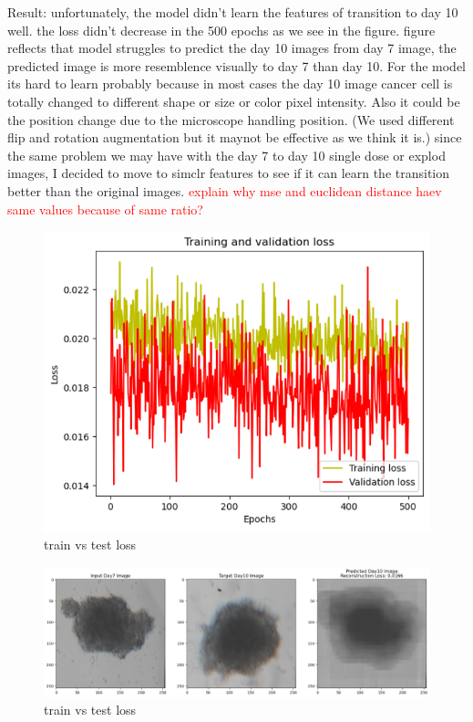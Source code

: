 Result: 
unfortunately, the model didn't learn the features of transition to day 10 well. the loss didn't decrease in the 500 epochs as we see in the figure.  figure reflects that
model struggles to predict the day 10 images from day 7 image, the predicted image is more resemblence visually to day 7 than day 10. For the model its hard to learn probably because in most cases the day 10 image cancer cell is totally changed to different 
shape or size or color pixel intensity. Also it could be the position change due to the microscope handling position. (We used different flip and rotation 
augmentation but it maynot be effective as we think it is.) since the same problem we may have with the day 7 to day 10 single dose or explod images, I decided to move to
simclr features to see if it can learn the transition better than the original images. 
\textcolor{red}{explain why mse and euclidean distance haev same values because of same ratio?}
\begin{figure}[H]
  \centering
  \includegraphics[scale=0.46]{figures/rankloss.png} 
  \caption{train vs test loss}
  \label{fig:uloss}
\end{figure}

\begin{figure}[H]
  \centering
  \includegraphics[scale=0.46]{figures/unpred.png} 
  \caption{train vs test loss}
  \label{fig:unloss}
\end{figure}

